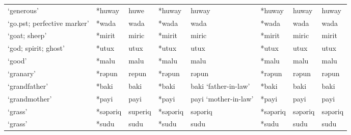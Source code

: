 \begin{landscape}
\begin{longtable}[c]{@{}p{3cm}<{\raggedright}p{2.75cm}<{\raggedright}p{2.75cm}<{\raggedright}p{2.75cm}<{\raggedright}p{2.75cm}<{\raggedright}p{2.75cm}<{\raggedright}p{2.75cm}<{\raggedright}p{2.75cm}<{\raggedright}@{}}
`generous'                                           & *huway       & huwe                          & *huway         & huway                      & *huway           & huway                    & huway                             \\
`go.pst; perfective marker'                          & *wada        & wada                          & *wada          & wada                       & *wada            & wada                     & wada                              \\
`goat; sheep'                                        & *mirit       & miric                         & *mirit         & miric                      & *mirit           & miric                    & mirit                             \\
`god; spirit; ghost'                                 & *utux        & utux                          & *utux          & utux                       & *utux            & utux                     & utux                              \\
`good'                                               & *malu        & malu                          & *malu          & malu                       & *malu            & malu                     & malu                              \\
`granary'                                            & *rəpun       & repun                         & *rəpun         & rəpun                      & *rəpun           & rəpun                    & rəpun                             \\
`grandfather'                                        & *baki        & baki                          & *baki          & baki `father-in-law'       & *baki            & baki                     & baki                              \\
`grandmother'                                        & *payi        & payi                          & *payi          & payi `mother-in-law'       & *payi            & payi                     & payi                              \\
`grass'                                              & *səpəriq     & superiq                       & *səpəriq       & səpəriq                    & *səpəriq         & səpəriq                  & səpəriq                           \\
`grass'                                              & *sudu        & sudu                          & *sudu          & sudu                       & *sudu            & sudu                     & sudu                              \\

\end{longtable}
\end{landscape}
